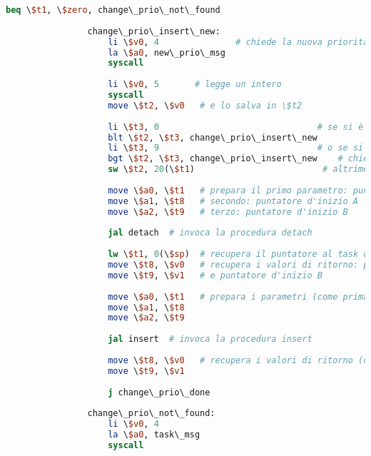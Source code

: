 \begin{center}
\begin{lstlisting}[language=mips, gobble=14, stepnumber=1]
                    beq \$t1, \$zero, change\_prio\_not\_found
                    
                change\_prio\_insert\_new:
                    li \$v0, 4               # chiede la nuova priorità del task
                    la \$a0, new\_prio\_msg
                    syscall
                    
                    li \$v0, 5       # legge un intero
                    syscall
                    move \$t2, \$v0   # e lo salva in \$t2
                
                    li \$t3, 0                               # se si è inserita una priorità minore di 0
                    blt \$t2, \$t3, change\_prio\_insert\_new
                    li \$t3, 9                               # o se si è inserita una priorità maggiore di 9
                    bgt \$t2, \$t3, change\_prio\_insert\_new    # chiedi nuovamente la priorità del task
                    sw \$t2, 20(\$t1)                         # altrimenti aggiorna la priorità nell'heap
                
                    move \$a0, \$t1   # prepara il primo parametro: puntatore al task da modificare
                    move \$a1, \$t8   # secondo: puntatore d'inizio A
                    move \$a2, \$t9   # terzo: puntatore d'inizio B
                    
                    jal detach  # invoca la procedura detach
                    
                    lw \$t1, 0(\$sp)  # recupera il puntatore al task da modificare dallo stack
                    move \$t8, \$v0   # recupera i valori di ritorno: puntatore d'inizio A
                    move \$t9, \$v1   # e puntatore d'inizio B
                    
                    move \$a0, \$t1   # prepara i parametri (come prima)
                    move \$a1, \$t8
                    move \$a2, \$t9
                    
                    jal insert  # invoca la procedura insert
                    
                    move \$t8, \$v0   # recupera i valori di ritorno (come prima)
                    move \$t9, \$v1
                    
                    j change\_prio\_done
                
                change\_prio\_not\_found:
                    li \$v0, 4
                    la \$a0, task\_msg
                    syscall
                    

\end{lstlisting}
\end{center}
